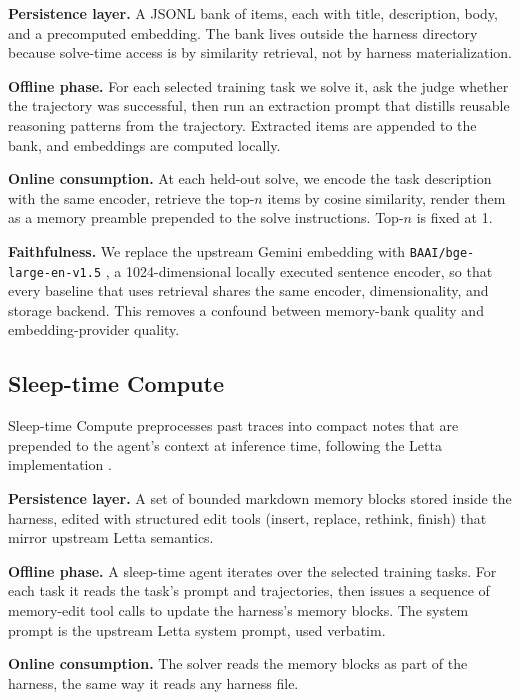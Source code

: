 \noindent\textbf{Persistence layer.}
A JSONL bank of items, each with title, description, body, and a precomputed embedding.
The bank lives outside the harness directory because solve-time access is by similarity retrieval, not by harness materialization.

\noindent\textbf{Offline phase.}
For each selected training task we solve it, ask the judge whether the trajectory was successful, then run an extraction prompt that distills reusable reasoning patterns from the trajectory.
Extracted items are appended to the bank, and embeddings are computed locally.

\noindent\textbf{Online consumption.}
At each held-out solve, we encode the task description with the same encoder, retrieve the top-$n$ items by cosine similarity, render them as a memory preamble prepended to the solve instructions.
Top-$n$ is fixed at 1.

\noindent\textbf{Faithfulness.}
We replace the upstream Gemini embedding with \texttt{BAAI/bge-large-en-v1.5} \citep{xiao2023cpack}, a 1024-dimensional locally executed sentence encoder, so that every baseline that uses retrieval shares the same encoder, dimensionality, and storage backend.
This removes a confound between memory-bank quality and embedding-provider quality.

\subsection{Sleep-time Compute \citep{lin2025sleeptime}}

Sleep-time Compute preprocesses past traces into compact notes that are prepended to the agent's context at inference time, following the Letta implementation \citep{packer2023memgpt}.

\noindent\textbf{Persistence layer.}
A set of bounded markdown memory blocks stored inside the harness, edited with structured edit tools (insert, replace, rethink, finish) that mirror upstream Letta semantics.

\noindent\textbf{Offline phase.}
A sleep-time agent iterates over the selected training tasks.
For each task it reads the task's prompt and trajectories, then issues a sequence of memory-edit tool calls to update the harness's memory blocks.
The system prompt is the upstream Letta system prompt, used verbatim.

\noindent\textbf{Online consumption.}
The solver reads the memory blocks as part of the harness, the same way it reads any harness file.

